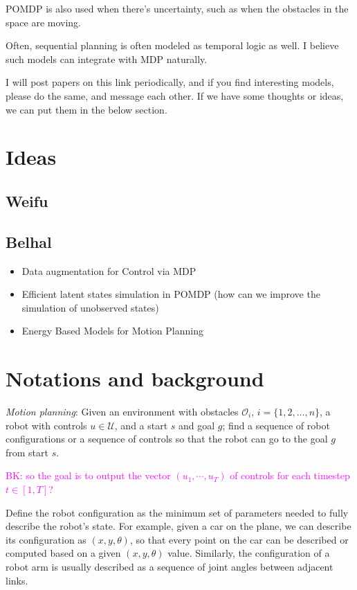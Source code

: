 \documentclass{article}
\begin{document}
POMDP is also used when there's uncertainty, such as when the obstacles in the space are moving. 

Often, sequential planning is often modeled as temporal logic as well. I believe such models can integrate with MDP naturally. 

I will post papers on this link periodically, and if you find interesting models, please do the same, and message each other. If we have some thoughts or ideas, we can put them in the below section. 



\section{Ideas}

\subsection{Weifu}

\subsection{Belhal}
\begin{itemize}
\item Data augmentation for Control via MDP
\item Efficient latent states simulation in POMDP (how can we improve the simulation of unobserved states)
\item Energy Based Models for Motion Planning
\end{itemize}


\section{Notations and background}

\noindent\textit{Motion planning}: Given an environment with obstacles $\mathcal{O}_i$, $i = \{1, 2, \ldots, n\}$, a robot with controls $u\in\mathcal{U}$, and a start $s$ and goal $g$; find a sequence of robot configurations or a sequence of controls so that the robot can go to the goal $g$ from start $s$. 

\textcolor{magenta}{BK: so the goal is to output the vector $(u_1, \cdots, u_T)$ of controls for each timestep $t \in [1, T]$?}

Define the robot configuration as the minimum set of parameters needed to fully describe the robot's state. For example, given a car on the plane, we can describe its configuration as $(x, y, \theta)$, so that every point on the car can be described or computed based on a given $(x, y, \theta)$ value. Similarly, the configuration of a robot arm is usually described as a sequence of joint angles between adjacent links. 
\end{document}

